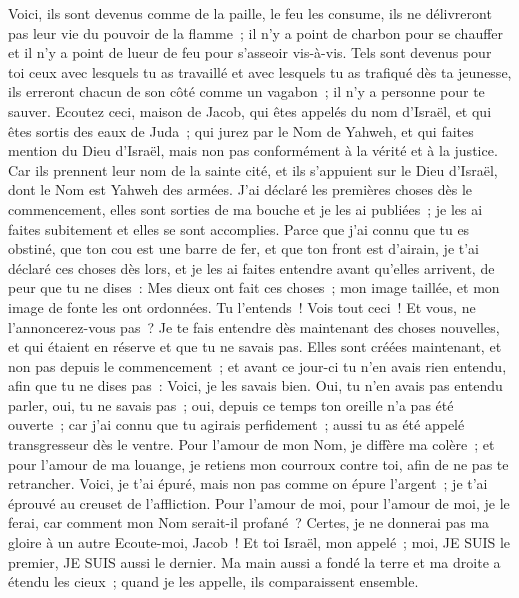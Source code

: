\begin{multicols}{2}
Voici, ils sont devenus comme de la paille, le feu les consume, ils ne délivreront pas leur vie du pouvoir de la flamme~; il n'y a point de charbon pour se chauffer et il n'y a point de lueur de feu pour s'asseoir vis-à-vis. 
Tels sont devenus pour toi ceux avec lesquels tu as travaillé et avec lesquels tu as trafiqué dès ta jeunesse, ils erreront chacun de son côté comme un vagabon~; il n'y a personne pour te sauver.
\VerseOne{}Ecoutez ceci, maison de Jacob, qui êtes appelés du nom d'Israël, et qui êtes sortis des eaux de Juda~; qui jurez par le Nom de Yahweh, et qui faites mention du Dieu d'Israël, mais non pas conformément à la vérité et à la justice.
Car ils prennent leur nom de la sainte cité, et ils s'appuient sur le Dieu d'Israël, dont le Nom est Yahweh des armées.
J'ai déclaré les premières choses dès le commencement, elles sont sorties de ma bouche et je les ai publiées~; je les ai faites subitement et elles se sont accomplies.
Parce que j'ai connu que tu es obstiné, que ton cou est une barre de fer, et que ton front est d'airain,
je t'ai déclaré ces choses dès lors, et je les ai faites entendre avant qu'elles arrivent, de peur que tu ne dises~: Mes dieux ont fait ces choses~; mon image taillée, et mon image de fonte les ont ordonnées.
Tu l'entends~! Vois tout ceci~! Et vous, ne l'annoncerez-vous pas~? Je te fais entendre dès maintenant des choses nouvelles, et qui étaient en réserve et que tu ne savais pas.
Elles sont créées maintenant, et non pas depuis le commencement~; et avant ce jour-ci tu n'en avais rien entendu, afin que tu ne dises pas~: Voici, je les savais bien.
Oui, tu n'en avais pas entendu parler, oui, tu ne savais pas~; oui, depuis ce temps ton oreille n'a pas été ouverte~; car j'ai connu que tu agirais perfidement~; aussi tu as été appelé transgresseur dès le ventre.
Pour l'amour de mon Nom, je diffère ma colère~; et pour l'amour de ma louange, je retiens mon courroux contre toi, afin de ne pas te retrancher.
Voici, je t'ai épuré, mais non pas comme on épure l'argent~; je t'ai éprouvé au creuset de l'affliction.
Pour l'amour de moi, pour l'amour de moi, je le ferai, car comment mon Nom serait-il profané~? Certes, je ne donnerai pas ma gloire à un autre
Ecoute-moi, Jacob~! Et toi Israël, mon appelé~; moi, JE SUIS le premier, JE SUIS aussi le dernier.
Ma main aussi a fondé la terre et ma droite a étendu les cieux~; quand je les appelle, ils comparaissent ensemble.

\end{multicols}
